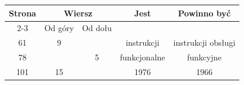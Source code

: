 \documentclass[a4paper,11pt]{article}
\numberwithin{equation}{section}
\begin{document}
\VerSpaceFour


































\newpage



\begin{center}

  \begin{tabular}{|c|c|c|c|c|}
    \hline
    Strona & \multicolumn{2}{c|}{Wiersz} & Jest
    & Powinno być \\ \cline{2-3}
           & Od góry & Od dołu & & \\
    \hline
    \hphantom{0}61 & \hphantom{0}9 & & instrukcji & instrukcji obsługi \\
    \hphantom{0}78 & & \hphantom{0}5 & funkcjonalne & funkcyjne \\
    101 & 15 & & 1976 & 1966 \\
    \hline
  \end{tabular}

\end{center}
\end{document}

